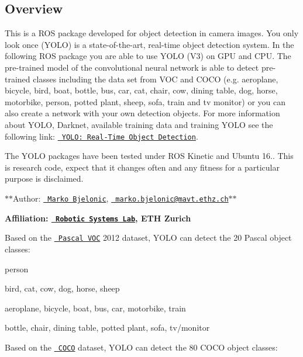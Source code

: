 \subsection*{Overview}

This is a R\+OS package developed for object detection in camera images. You only look once (Y\+O\+LO) is a state-\/of-\/the-\/art, real-\/time object detection system. In the following R\+OS package you are able to use Y\+O\+LO (V3) on G\+PU and C\+PU. The pre-\/trained model of the convolutional neural network is able to detect pre-\/trained classes including the data set from V\+OC and C\+O\+CO (e.\+g. aeroplane, bicycle, bird, boat, bottle, bus, car, cat, chair, cow, dining table, dog, horse, motorbike, person, potted plant, sheep, sofa, train and tv monitor) or you can also create a network with your own detection objects. For more information about Y\+O\+LO, Darknet, available training data and training Y\+O\+LO see the following link\+: \href{http://pjreddie.com/darknet/yolo/}{\texttt{ Y\+O\+L\+O\+: Real-\/\+Time Object Detection}}.

The Y\+O\+LO packages have been tested under R\+OS Kinetic and Ubuntu 16.. This is research code, expect that it changes often and any fitness for a particular purpose is disclaimed.

$\ast$$\ast$\+Author\+: \href{https://sites.google.com/site/bjelonicmarko/}{\texttt{ Marko Bjelonic}}, \href{mailto:marko.bjelonic@mavt.ethz.ch}{\texttt{ marko.\+bjelonic@mavt.\+ethz.\+ch}}$\ast$$\ast$

{\bfseries{Affiliation\+: \href{http://www.rsl.ethz.ch/}{\texttt{ Robotic Systems Lab}}, E\+TH Zurich}}

 

Based on the \href{https://pjreddie.com/projects/pascal-voc-dataset-mirror/}{\texttt{ Pascal V\+OC}} 2012 dataset, Y\+O\+LO can detect the 20 Pascal object classes\+:


\begin{DoxyItemize}
\item person
\item bird, cat, cow, dog, horse, sheep
\item aeroplane, bicycle, boat, bus, car, motorbike, train
\item bottle, chair, dining table, potted plant, sofa, tv/monitor
\end{DoxyItemize}

Based on the \href{http://cocodataset.org/\#home}{\texttt{ C\+O\+CO}} dataset, Y\+O\+LO can detect the 80 C\+O\+CO object classes\+:


